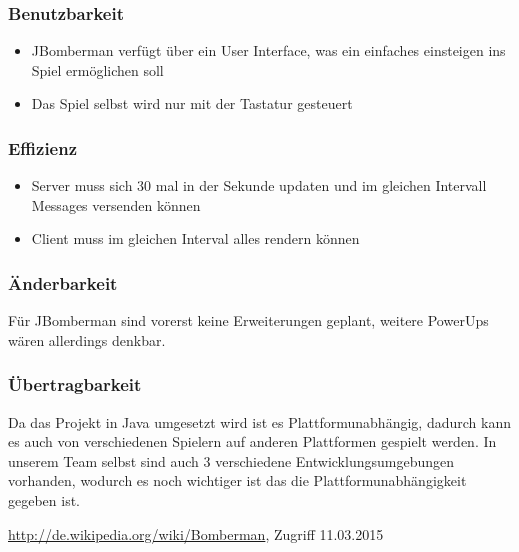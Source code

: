 \documentclass[11pt]{scrartcl}
\begin{document}
\subsubsection{Benutzbarkeit}
\label{sec:Benutzbarkeit}
\begin{itemize}
    \item JBomberman verfügt über ein User Interface, was ein einfaches einsteigen ins Spiel ermöglichen soll
    \item Das Spiel selbst wird nur mit der Tastatur gesteuert
\end{itemize}

\subsubsection{Effizienz}
\label{sec:Effizienz}
\begin{itemize}
    \item Server muss sich 30 mal in der Sekunde updaten und im gleichen Intervall Messages versenden können
    \item Client muss im gleichen Interval alles rendern können
\end{itemize}

\subsubsection{Änderbarkeit}
\label{sec:Änderbarkeit}
Für JBomberman sind vorerst keine Erweiterungen geplant, weitere PowerUps wären allerdings denkbar.


\subsubsection{Übertragbarkeit}
\label{sec:Übertragbarkeit}
Da das Projekt in Java umgesetzt wird ist es Plattformunabhängig, dadurch kann es auch von verschiedenen Spielern auf anderen Plattformen gespielt werden.
In unserem Team selbst sind auch 3 verschiedene Entwicklungsumgebungen vorhanden, wodurch es noch wichtiger ist das die Plattformunabhängigkeit gegeben ist.



\begin{thebibliography}{999}
\url{http://de.wikipedia.org/wiki/Bomberman}, Zugriff 
11.03.2015
\end{thebibliography}
\end{document}
